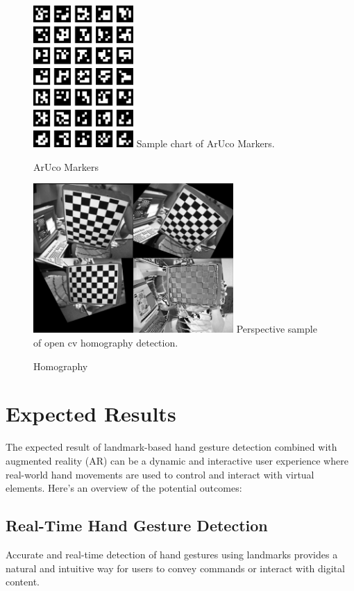 \documentclass[journal]{IEEEtran}
\begin{document}
\begin{figure}[!t]
  \centering
  \includegraphics[width=1.5in]{photo/aruco-markers.png}
  Sample chart of ArUco Markers.
  \caption{ArUco Markers}
  \label{fig:aruco_markers}
\end{figure}

\begin{figure}[!t]
  \centering
  \includegraphics[width=3in]{photo/homography.jpg}
  Perspective sample of open cv homography detection.
  \caption{Homography}
  \label{fig:homography}
\end{figure}

\section{Expected Results}

The expected result of landmark-based hand gesture detection combined with augmented reality (AR) can be a dynamic and interactive 
user experience where real-world hand movements are used to control and interact with virtual elements. 
Here's an overview of the potential outcomes:
\subsection*{Real-Time Hand Gesture Detection}
Accurate and real-time detection of hand gestures using landmarks provides a natural and intuitive way for users to convey commands or 
interact with digital content.
\end{document}
